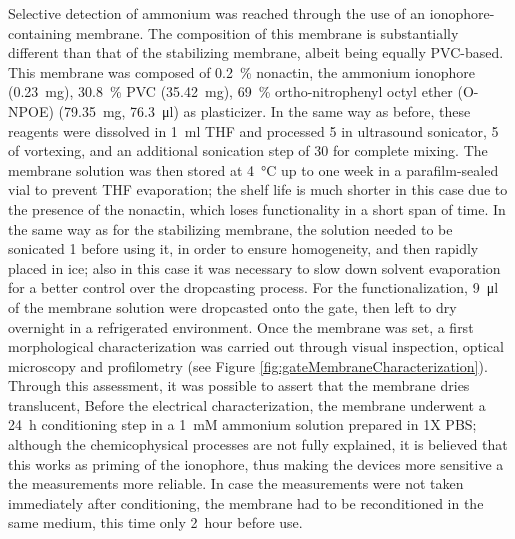 Selective detection of ammonium was reached through the use of an ionophore-containing membrane. The composition of this membrane is substantially different than that of the stabilizing membrane, albeit being equally PVC-based. This membrane was composed of \SI{0.2}{\%} nonactin, the ammonium ionophore (\SI{0.23}{\mg}), \SI{30.8}{\%} PVC (\SI{35.42}{\mg}), \SI{69}{\%} ortho-nitrophenyl octyl ether (O-NPOE) (\SI{79.35}{\mg}, \ie{} \SI{76.3}{\ul}) as plasticizer. In the same way as before, these reagents were dissolved in \SI{1}{\ml} THF and processed \SI{5}{\min} in ultrasound sonicator, \SI{5}{\min} of vortexing, and an additional sonication step of \SI{30}{\min} for complete mixing. The membrane solution was then stored at \SI{4}{\celsius} up to one week in a parafilm-sealed vial to prevent THF evaporation; the shelf life is much shorter in this case due to the presence of the nonactin, which loses functionality in a short span of time. 
In the same way as for the stabilizing membrane, the solution needed to be sonicated \SI{1}{\min} before using it, in order to ensure homogeneity, and then rapidly placed in ice; also in this case it was necessary to slow down solvent evaporation for a better control over the dropcasting process.
For the functionalization, \SI{9}{\ul} of the membrane solution were dropcasted onto the gate, then left to dry overnight in a refrigerated environment. 
Once the membrane was set, a first morphological characterization was carried out through visual inspection, optical microscopy and profilometry (see Figure \ref{fig:gateMembraneCharacterization}). Through this assessment, it was possible to assert that the membrane dries translucent, 
Before the electrical characterization, the membrane underwent a \SI{24}{\hour} conditioning step in a \SI{1}{mM} ammonium solution prepared in 1X PBS; although the chemicophysical processes are not fully explained, it is believed that this works as priming of the ionophore, thus making the devices more sensitive a the measurements more reliable. In case the measurements were not taken immediately after conditioning, the membrane had to be reconditioned in the same medium, this time only \SI{2}{hour} before use.

